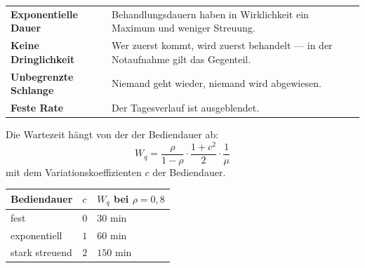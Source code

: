 \begin{warnung}
\begin{center}
{\small
\renewcommand{\arraystretch}{1.52}
\begin{tabular}{@{}P{2.6cm}P{6.0cm}@{}}
\toprule
\textbf{Exponentielle Dauer} & Behandlungsdauern haben in Wirklichkeit ein Maximum und weniger Streuung.\\
\textbf{Keine Dringlichkeit} & Wer zuerst kommt, wird zuerst behandelt --- in der Notaufnahme gilt das Gegenteil.\\
\textbf{Unbegrenzte Schlange} & Niemand geht wieder, niemand wird abgewiesen.\\
\textbf{Feste Rate} & Der Tagesverlauf ist ausgeblendet.\\
\bottomrule
\end{tabular}}
\end{center}

Die Wartezeit hängt von der  der Bediendauer ab:
\[ W_q = \frac{\rho}{1-\rho}\cdot\frac{1+c^{2}}{2}\cdot\frac{1}{\mu} \]
mit dem Variationskoeffizienten $c$ der Bediendauer.

\begin{center}
{\small
\renewcommand{\arraystretch}{1.48}
\begin{tabular}{@{}P{2.8cm}P{1.6cm}P{2.4cm}@{}}
\toprule
\textbf{Bediendauer} & $c$ & $W_q$ bei $\rho=0{,}8$\\
\midrule
fest & $0$ & $30$ min\\
exponentiell & $1$ & $60$ min\\
stark streuend & $2$ & $150$ min\\
\bottomrule
\end{tabular}}
\end{center}

\begin{center}
\begin{minipage}{0.88\textwidth}
\end{minipage}
\end{center}
\end{warnung}

